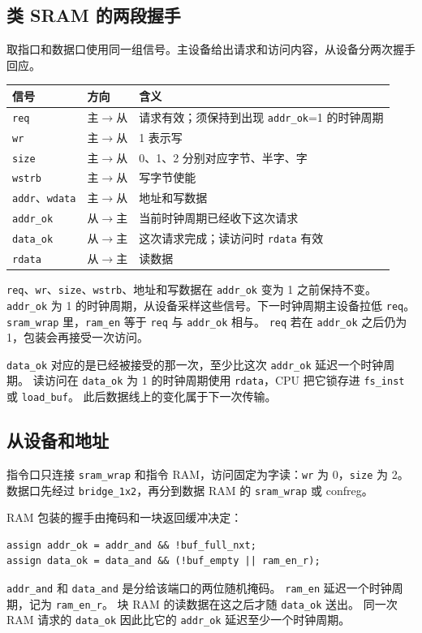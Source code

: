 \documentclass{article}
\begin{document}
\subsection{类 SRAM 的两段握手}
取指口和数据口使用同一组信号。主设备给出请求和访问内容，从设备分两次握手回应。

\begin{center}
\small
\begin{tabular}{@{}llp{}@{}}
\toprule
信号 & 方向 & 含义 \\
\midrule
\texttt{req} & 主$\to$从 & 请求有效；须保持到出现 \texttt{addr\_ok}=1 的时钟周期 \\
\texttt{wr} & 主$\to$从 & 1 表示写 \\
\texttt{size} & 主$\to$从 & 0、1、2 分别对应字节、半字、字 \\
\texttt{wstrb} & 主$\to$从 & 写字节使能 \\
\texttt{addr}、\texttt{wdata} & 主$\to$从 & 地址和写数据 \\
\texttt{addr\_ok} & 从$\to$主 & 当前时钟周期已经收下这次请求 \\
\texttt{data\_ok} & 从$\to$主 & 这次请求完成；读访问时 \texttt{rdata} 有效 \\
\texttt{rdata} & 从$\to$主 & 读数据 \\
\bottomrule
\end{tabular}
\end{center}

\texttt{req}、\texttt{wr}、\texttt{size}、\texttt{wstrb}、地址和写数据在 \texttt{addr\_ok} 变为 1 之前保持不变。
\texttt{addr\_ok} 为 1 的时钟周期，从设备采样这些信号。下一时钟周期主设备拉低 \texttt{req}。
\texttt{sram\_wrap} 里，\texttt{ram\_en} 等于 \texttt{req} 与 \texttt{addr\_ok} 相与。
\texttt{req} 若在 \texttt{addr\_ok} 之后仍为 1，包装会再接受一次访问。

\texttt{data\_ok} 对应的是已经被接受的那一次，至少比这次 \texttt{addr\_ok} 延迟一个时钟周期。
读访问在 \texttt{data\_ok} 为 1 的时钟周期使用 \texttt{rdata}，CPU 把它锁存进 \texttt{fs\_inst} 或 \texttt{load\_buf}。
此后数据线上的变化属于下一次传输。

\subsection{从设备和地址}
指令口只连接 \texttt{sram\_wrap} 和指令 RAM，访问固定为字读：\texttt{wr} 为 0，\texttt{size} 为 2。
数据口先经过 \texttt{bridge\_1x2}，再分到数据 RAM 的 \texttt{sram\_wrap} 或 confreg。

RAM 包装的握手由掩码和一块返回缓冲决定：
\begin{verbatim}
assign addr_ok = addr_and && !buf_full_nxt;
assign data_ok = data_and && (!buf_empty || ram_en_r);
\end{verbatim}
\texttt{addr\_and} 和 \texttt{data\_and} 是分给该端口的两位随机掩码。
\texttt{ram\_en} 延迟一个时钟周期，记为 \texttt{ram\_en\_r}。
块 RAM 的读数据在这之后才随 \texttt{data\_ok} 送出。
同一次 RAM 请求的 \texttt{data\_ok} 因此比它的 \texttt{addr\_ok} 延迟至少一个时钟周期。
\end{document}
